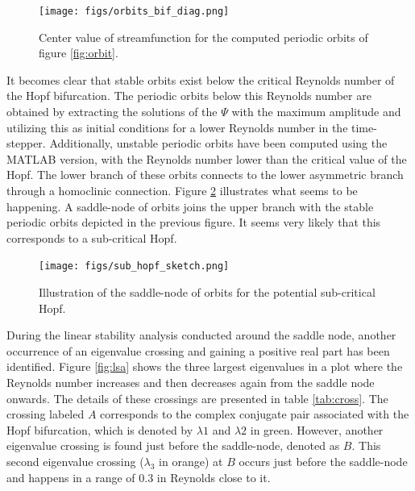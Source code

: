 \begin{figure}[ht]
  \centering
  \texttt{[image: figs/orbits\_bif\_diag.png]}
  \caption{Center value of streamfunction for the computed periodic orbits of figure \ref{fig:orbit}.} 
  \label{fig:orbit_bif_diag}
\end{figure}

It becomes clear that stable orbits exist below the critical Reynolds number of
the Hopf bifurcation. The periodic orbits below this Reynolds number are
obtained by extracting the solutions of the $\Psi$ with the maximum amplitude
and utilizing this as initial conditions for a lower Reynolds number in the
time-stepper. Additionally, unstable periodic orbits have been computed using
the MATLAB version, with the Reynolds number lower than the critical value of
the Hopf. The lower branch of these orbits connects to the lower asymmetric
branch through a homoclinic connection. Figure \ref{fig:sub_hopf_sketch}
illustrates what seems to be happening. A saddle-node of orbits joins the upper
branch with the stable periodic orbits depicted in the previous figure. It
seems very likely that this corresponds to a sub-critical Hopf.

\begin{figure}[ht]
  \centering
  \texttt{[image: figs/sub\_hopf\_sketch.png]}
  \caption{Illustration of the saddle-node of orbits for the potential sub-critical Hopf.} 
  \label{fig:sub_hopf_sketch}
\end{figure}

During the linear stability analysis conducted around the saddle node, another
occurrence of an eigenvalue crossing and gaining a positive real part has been
identified. Figure \ref{fig:lsa} shows the three largest eigenvalues in a plot
where the Reynolds number increases and then decreases again from the saddle
node onwards. The details of these crossings are presented in table
\ref{tab:cross}. The crossing labeled $A$ corresponds to the complex conjugate
pair associated with the Hopf bifurcation, which is denoted by $\lambda1$ and
$\lambda2$ in green. However, another eigenvalue crossing is found just before
the saddle-node, denoted as $B$. This second eigenvalue crossing ($\lambda_3$
in orange) at $B$ occurs just before the saddle-node and happens in a range of
$0.3$ in Reynolds close to it. \\\\

